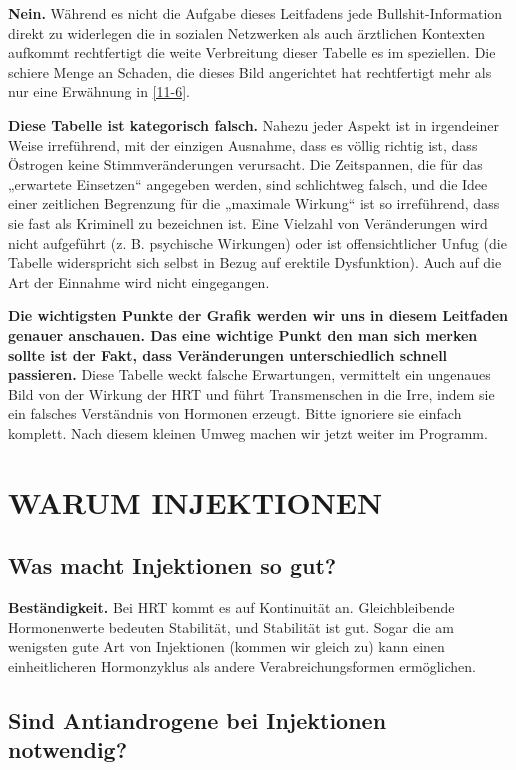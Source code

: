 \documentclass{article}
\begin{document}
{\textbf{Nein.} Während es nicht die Aufgabe dieses Leitfadens jede Bullshit-Information direkt zu widerlegen die in sozialen Netzwerken als auch ärztlichen Kontexten aufkommt rechtfertigt die weite Verbreitung dieser Tabelle es im speziellen. Die schiere Menge an Schaden, die dieses Bild angerichtet hat rechtfertigt mehr als nur eine Erwähnung in \ref{11-6}.

\textbf{Diese Tabelle ist kategorisch falsch.} Nahezu jeder Aspekt ist in irgendeiner Weise irreführend, mit der einzigen Ausnahme, dass es völlig richtig ist, dass Östrogen keine Stimmveränderungen verursacht. Die Zeitspannen, die für das „erwartete Einsetzen“ angegeben werden, sind schlichtweg falsch, und die Idee einer zeitlichen Begrenzung für die „maximale Wirkung“ ist so irreführend, dass sie fast als Kriminell zu bezeichnen ist. Eine Vielzahl von Veränderungen wird nicht aufgeführt (z. B. psychische Wirkungen) oder ist offensichtlicher Unfug (die Tabelle widerspricht sich selbst in Bezug auf erektile Dysfunktion). Auch auf die Art der Einnahme wird nicht eingegangen.

\textbf{Die wichtigsten Punkte der Grafik werden wir uns in diesem Leitfaden genauer anschauen. Das eine wichtige Punkt den man sich merken sollte ist der Fakt, dass Veränderungen unterschiedlich schnell passieren.} Diese Tabelle weckt falsche Erwartungen, vermittelt ein ungenaues Bild von der Wirkung der HRT und führt Transmenschen in die Irre, indem sie ein falsches Verständnis von Hormonen erzeugt. Bitte ignoriere sie einfach komplett. Nach diesem kleinen Umweg machen wir jetzt weiter im Programm.

\section{WARUM INJEKTIONEN}

\subsection{Was macht Injektionen so gut?}

\textbf{Beständigkeit.} Bei HRT kommt es auf Kontinuität an. Gleichbleibende Hormonenwerte bedeuten Stabilität, und Stabilität ist gut. Sogar die am wenigsten gute Art von Injektionen (kommen wir gleich zu) kann einen einheitlicheren Hormonzyklus als andere Verabreichungsformen ermöglichen.

\subsection{Sind Antiandrogene bei Injektionen notwendig?}

}
\end{document}
